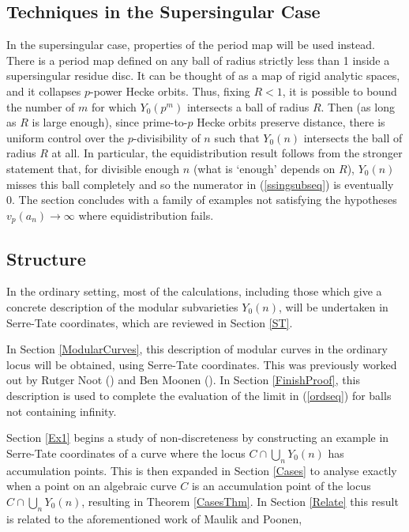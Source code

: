\documentclass[12pt,letterpaper]{article}
\begin{document}
  
  
	
	\subsection{Techniques in the Supersingular Case}
	
	In the supersingular case, properties of the period map will be used instead. There is a period map defined on any ball of radius strictly less than 1 inside a supersingular residue disc. It can be thought of as a map of rigid analytic spaces, and it collapses $p$-power Hecke orbits. Thus, fixing $R<1$, it is possible to bound the number of $m$ for which $Y_0(p^m)$ intersects a ball of radius $R$. Then (as long as $R$ is large enough), since prime-to-$p$ Hecke orbits preserve distance, there is uniform control over the $p$-divisibility of $n$ such that $Y_0(n)$ intersects the ball of radius $R$ at all. In particular, the equidistribution result follows from the stronger statement that, for divisible enough $n$ (what is `enough' depends on $R$), $Y_0(n)$ misses this ball completely and so the numerator in (\ref{ssingsubseq}) is eventually 0. The section concludes with a family of examples not satisfying the hypotheses $v_p(a_n)\to\infty$ where equidistribution fails.
	
	
	
	
	
	
	\subsection{Structure}
	
	In the ordinary setting, most of the calculations, including those which give a concrete description of the modular subvarieties $Y_0(n)$, will be undertaken in Serre-Tate coordinates, which are reviewed in Section \ref{ST}.
	
	
	In Section \ref{ModularCurves}, this description of modular curves in the ordinary locus will be obtained, using Serre-Tate coordinates. This was previously worked out by Rutger Noot  (\cite{Noo96}) and Ben Moonen (\cite{Moo98II}). In Section \ref{FinishProof}, this description is used to complete the evaluation of the limit in (\ref{ordseq}) for balls not containing infinity.
	
	Section \ref{Ex1} begins a study of non-discreteness by constructing an example in Serre-Tate coordinates of a curve where the locus $C\cap \bigcup_n Y_0(n)$ has accumulation points. This is then expanded in Section \ref{Cases} to analyse exactly when a point on an algebraic curve $C$ is an accumulation point of the locus $C\cap \bigcup_n Y_0(n)$, resulting in Theorem \ref{CasesThm}. In Section \ref{Relate} this result is related to the aforementioned work of Maulik and Poonen, \cite{MP09}
	
\end{document}

